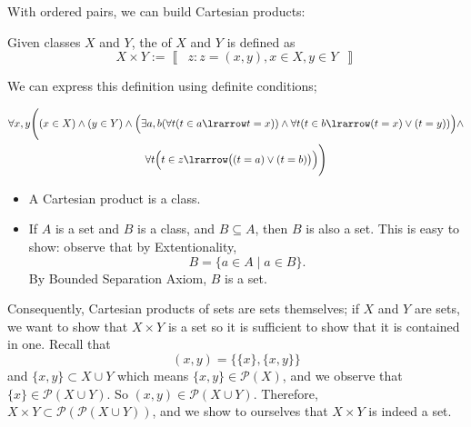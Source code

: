 \documentclass[notoc,notitlepage]{tufte-book}
\newcommand{\class}[1]{\left\llbracket \enspace #1 \enspace \right\rrbracket}
\begin{document}
With ordered pairs, we can build Cartesian products:

\begin{defn}
\label{defn:cartesian_product}
  Given classes $X$ and $Y$, the  of $X$ and $Y$ is defined as
  \begin{equation*}
    X \times Y := \class{ z : z = (x, y), x \in X, y \in Y }
  \end{equation*}
\end{defn}

\begin{note}
  We can express this definition using definite conditions;
  \begin{fullwidth}
  \begin{gather*}
    \forall x, y \Bigg( (x \in X) \land (y \in Y) \land \Big( \exists a, b ( \forall t ( t \in a \lrarrow t = x ) ) \land \forall t ( t \in b \lrarrow (t = x) \lor (t = y) ) \Big) \land \\
    \forall t \Big( t \in z \lrarrow \big( (t = a) \lor (t = b) \big) \Big) \Bigg)
  \end{gather*}
  \end{fullwidth}
\end{note}

\begin{note}
  \begin{itemize}
    \item A Cartesian product is a class.
    \item If $A$ is a set and $B$ is a class, and $B \subseteq A$, then $B$ is also a set. This is easy to show: observe that by Extentionality,
      \begin{equation*}
        B = \{ a \in A \mid a \in B \}.
      \end{equation*}
      By Bounded Separation Axiom, $B$ is a set.
  \end{itemize}
\end{note}

Consequently, Cartesian products of sets are sets themselves; if $X$ and $Y$ are sets, we want to show that $X \times Y$ is a set so it is sufficient to show that it is contained in one. Recall that
\begin{equation*}
  (x, y) = \{ \{ x \}, \{ x, y \} \}
\end{equation*}
and $\{ x, y \} \subset X \cup Y$ which means $\{ x, y \} \in \mathcal{P}(X)$, and we observe that $\{ x \} \in \mathcal{P}(X \cup Y)$. So $(x, y) \in \mathcal{P}(X \cup Y)$. Therefore, $X \times Y \subset \mathcal{P} ( \mathcal{P} (X \cup Y) )$, and we show to ourselves that $X \times Y$ is indeed a set.
\end{document}
